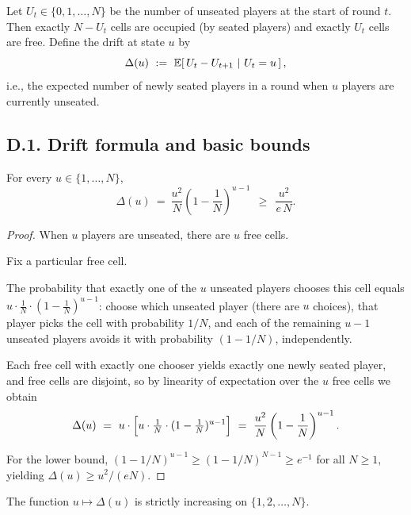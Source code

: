 Let $U_t\in\{0,1,\dots,N\}$ be the number of unseated players at the start of round $t$.
Then exactly $N-U_t$ cells are occupied (by seated players) and exactly $U_t$ cells are free.
Define the  {drift} at state $u$ by
\begin{equation}
\label{eq:mc-drift-def}
\Delta(u)\ :=\ \EE\!\left[\,U_t-U_{t+1}\ \middle|\ U_t=u\,\right],
\end{equation}
i.e., the expected number of newly seated players in a round when $u$ players are currently unseated.

\subsection*{D.1.\; Drift formula and basic bounds}

\begin{lemma}
\label{lem:mc-drift}
For every $u\in\{1,\dots,N\}$,
\begin{equation}
\label{eq:mc-drift}
\Delta(u)\ =\ \frac{u^2}{N}\left(1-\frac{1}{N}\right)^{u-1}
\ \ \ge\ \ \frac{u^2}{e\,N}.
\end{equation}
\end{lemma}

\begin{proof}
When $u$ players are unseated, there are $u$ free cells. 

Fix a particular free cell.


The probability that  {exactly one} of the $u$ unseated players chooses this cell equals
$u\cdot \tfrac{1}{N}\cdot (1-\tfrac{1}{N})^{u-1}$: choose which unseated player (there are $u$ choices), that player picks the cell with probability $1/N$, and each of the remaining $u-1$ unseated players avoids it with probability $(1-1/N)$, independently.

Each free cell with exactly one chooser yields exactly one newly seated player, and free cells are disjoint, so by linearity of expectation over the $u$ free cells we obtain
\[
\Delta(u)\ =\ u\cdot \Bigl[u\cdot \tfrac{1}{N}\cdot (1-\tfrac{1}{N})^{u-1}\Bigr]\ =\ \frac{u^2}{N}\left(1-\frac{1}{N}\right)^{u-1}.
\]

For the lower bound, $(1-1/N)^{u-1}\ge (1-1/N)^{N-1}\ge e^{-1}$ for all $N\ge 1$, yielding $\Delta(u)\ge u^2/(eN)$.
\end{proof}

\begin{lemma}
\label{lem:mc-drift-monotone}
The function $u\mapsto \Delta(u)$ is strictly increasing on $\{1,2,\dots,N\}$.
\end{lemma}

